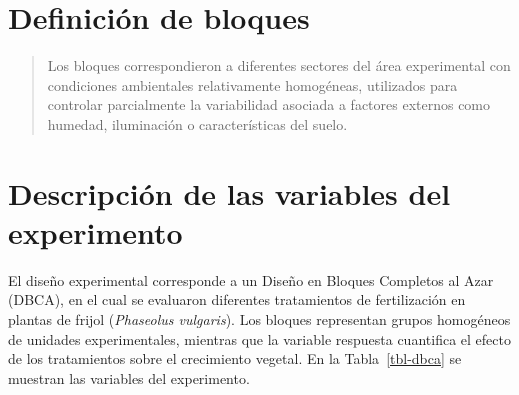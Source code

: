 \documentclass[
  spanish,
  letterpaper,
  DIV=11,
  numbers=noendperiod]{scrreprt}
\begin{document}
\section{Definición de bloques}\label{definiciuxf3n-de-bloques}

\begin{quote}
Los bloques correspondieron a diferentes sectores del área experimental
con condiciones ambientales relativamente homogéneas, utilizados para
controlar parcialmente la variabilidad asociada a factores externos como
humedad, iluminación o características del suelo.
\end{quote}

\section{Descripción de las variables del
experimento}\label{descripciuxf3n-de-las-variables-del-experimento}

El diseño experimental corresponde a un Diseño en Bloques Completos al
Azar (DBCA), en el cual se evaluaron diferentes tratamientos de
fertilización en plantas de frijol (\emph{Phaseolus vulgaris}). Los
bloques representan grupos homogéneos de unidades experimentales,
mientras que la variable respuesta cuantifica el efecto de los
tratamientos sobre el crecimiento vegetal. En la Tabla~\ref{tbl-dbca} se
muestran las variables del experimento.
\end{document}
